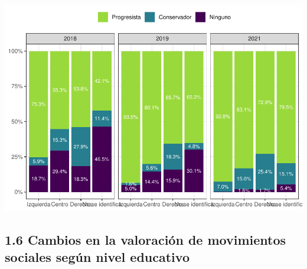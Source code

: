 \documentclass[
  12pt,
]{book}
\begin{document}
\includegraphics{reporte-elsoc_files/figure-latex/unnamed-chunk-10-1.pdf}

\hypertarget{cambios-en-la-valoraciuxf3n-de-movimientos-sociales-seguxfan-nivel-educativo}{%
\subsection{1.6 Cambios en la valoración de movimientos sociales según nivel educativo}\label{cambios-en-la-valoraciuxf3n-de-movimientos-sociales-seguxfan-nivel-educativo}}
\end{document}

